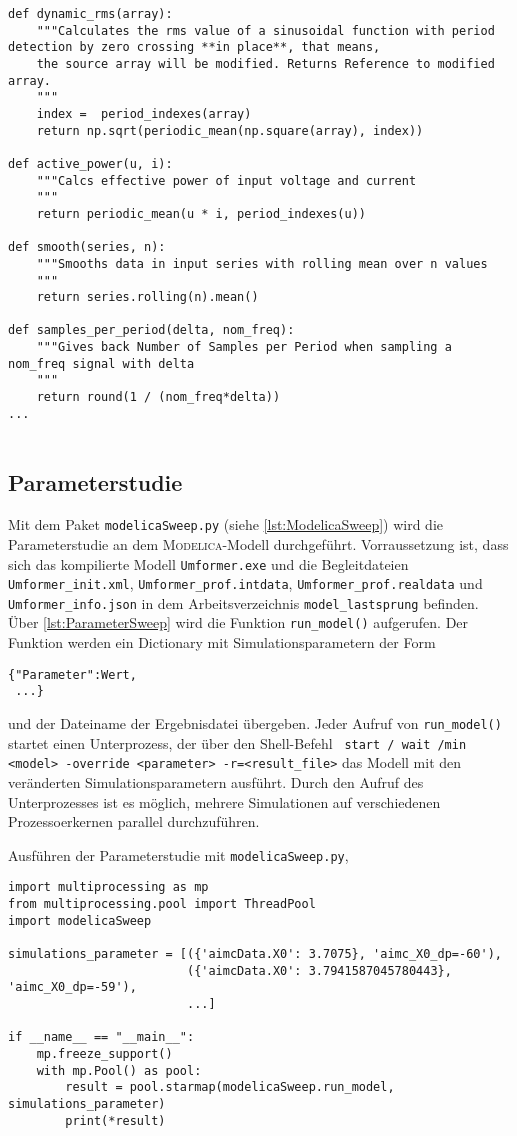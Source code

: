 \begin{verbatim}
def dynamic_rms(array):
    """Calculates the rms value of a sinusoidal function with period detection by zero crossing **in place**, that means,
    the source array will be modified. Returns Reference to modified array.
    """
    index =  period_indexes(array)
    return np.sqrt(periodic_mean(np.square(array), index))

def active_power(u, i):
    """Calcs effective power of input voltage and current
    """
    return periodic_mean(u * i, period_indexes(u))
    
def smooth(series, n):
    """Smooths data in input series with rolling mean over n values
    """
    return series.rolling(n).mean()

def samples_per_period(delta, nom_freq):
    """Gives back Number of Samples per Period when sampling a nom_freq signal with delta 
    """
    return round(1 / (nom_freq*delta))
...
		
\end{verbatim}
\endgroup


\subsection{Parameterstudie}
Mit dem Paket \texttt{modelicaSweep.py} (siehe \cref{lst:ModelicaSweep}) wird die Parameterstudie an dem \textsc{Modelica}-Modell durchgeführt. Vorraussetzung ist, dass sich das kompilierte Modell \texttt{Umformer.exe} und die Begleitdateien \texttt{Umformer\_init.xml}, \texttt{Umformer\_prof.intdata}, \texttt{Umformer\_prof.realdata} und \texttt{Umformer\_info.json} in dem Arbeitsverzeichnis \texttt{model\_\-lastsprung} befinden. Über \cref{lst:ParameterSweep} wird die Funktion \texttt{run_model()} aufgerufen. Der Funktion werden ein Dictionary mit Simulationsparametern der Form 
\begin{verbatim}
{"Parameter":Wert,
 ...}
\end{verbatim}
und der Dateiname der Ergebnisdatei übergeben. Jeder Aufruf von \texttt{run_model()} startet einen Unterprozess, der über den Shell-Befehl \texttt{ start / wait /min <model> -override <parameter> -r=<result\_file>} das Modell mit den veränderten Simulationsparametern ausführt. Durch den Aufruf des Unterprozesses ist es möglich, mehrere Simulationen auf verschiedenen Prozessoerkernen parallel durchzuführen.

\begingroup
\captionsetup{type=listing}
\caption{Ausführen der Parameterstudie mit \texttt{modelicaSweep.py},\label{lst:ParameterSweep}}
\begin{verbatim}
import multiprocessing as mp
from multiprocessing.pool import ThreadPool
import modelicaSweep

simulations_parameter = [({'aimcData.X0': 3.7075}, 'aimc_X0_dp=-60'),
                         ({'aimcData.X0': 3.7941587045780443}, 'aimc_X0_dp=-59'),
                         ...]

if __name__ == "__main__":
    mp.freeze_support()
    with mp.Pool() as pool:
        result = pool.starmap(modelicaSweep.run_model, simulations_parameter)
        print(*result)
\end{verbatim}
\endgroup


